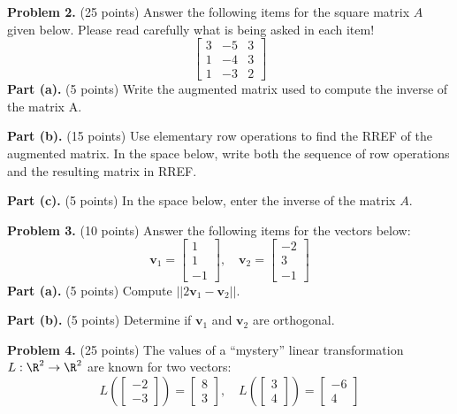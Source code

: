 \documentclass[12pt]{article}
\begin{document}
\textbf{Problem 2.} (25 points) Answer the following items for the square matrix $A$ given below. Please read carefully what is being asked in each item!
\[
\left[\begin{matrix}3 & -5 & 3\\1 & -4 & 3\\1 & -3 & 2\end{matrix}\right]
\]
\textbf{Part (a).} (5 points) Write the augmented matrix used to compute the inverse of the matrix A.

\vskip1in

\textbf{Part (b).} (15 points) Use elementary row operations to find the RREF of the augmented matrix.
In the space below, write both the sequence of row operations and the resulting matrix in RREF.

\vskip3.5in

\textbf{Part (c).} (5 points) In the space below, enter the inverse of the matrix $A$.

\clearpage

\textbf{Problem 3.} (10 points) Answer the following items for the vectors below:
\[
\mathbf{v}_1=\left[\begin{matrix}1\\1\\-1\end{matrix}\right],\quad
\mathbf{v}_2=\left[\begin{matrix}-2\\3\\-1\end{matrix}\right]
\]
\textbf{Part (a).} (5 points) Compute $||2\textbf{v}_1-\textbf{v}_2||$.

\vskip3.5in

\textbf{Part (b).} (5 points) Determine if $\textbf{v}_1$ and $\textbf{v}_2$ are orthogonal.

\clearpage

\textbf{Problem 4.} (25 points) The values of a ``mystery'' linear transformation $L:\R^2\to\R^2$ are known for two vectors:
\[
L\left(\left[\begin{matrix}-2\\-3\end{matrix}\right]\right)=\left[\begin{matrix}8\\3\end{matrix}\right],\quad L\left(\left[\begin{matrix}3\\4\end{matrix}\right]\right)=\left[\begin{matrix}-6\\4\end{matrix}\right]
\]
\end{document}
